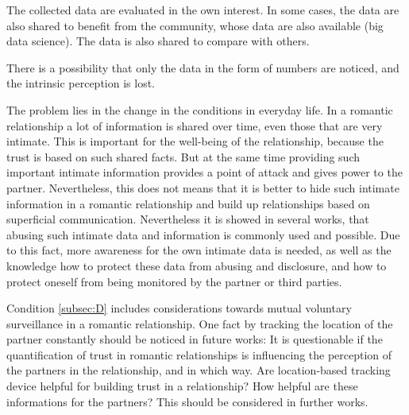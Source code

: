 \documentclass[journal]{vgtc}                %
\begin{document}
The collected data are evaluated in the own interest. In some cases, the data are also shared to benefit from the community, whose data are also available (big data science). The data is also shared to compare with others.

There is a possibility that only the data in the form of numbers are noticed, and the intrinsic perception is lost.

The problem lies in the change in the conditions in everyday life.
In a romantic relationship a lot of information is shared over time, even those that are very intimate. This is important for the well-being of the relationship, because the trust is based on such shared facts. But at the same time providing such important intimate information provides a point of attack and gives power to the partner. Nevertheless, this does not means that it is better to hide such intimate information in a romantic relationship and build up relationships based on superficial communication.
Nevertheless it is showed in several works, that abusing such intimate data and information is commonly used and possible. Due to this fact, more awareness for the own intimate data is needed, as well as the knowledge how to protect these data from abusing and disclosure, and how to protect oneself from being monitored by the partner or third parties.

Condition \ref{subsec:D} includes considerations towards mutual voluntary surveillance in a romantic relationship. One fact by tracking the location of the partner constantly should be noticed in future works: It is questionable if the quantification of trust in romantic relationships is influencing the perception of the partners in the relationship, and in which way. Are location-based tracking device helpful for building trust in a relationship? How helpful are these informations for the partners? This should be considered in further works.

\printbibliography
\end{document}
